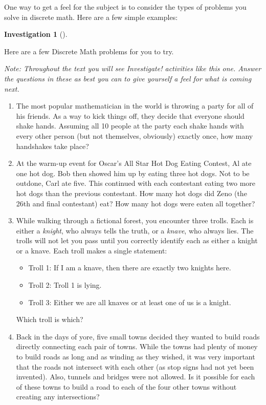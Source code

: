 \documentclass[10pt,]{book}
\theoremstyle{plain}
\theoremstyle{definition}
\theoremstyle{definition}
\newtheorem{investigation}[project]{Investigation}
\theoremstyle{definition}
\numberwithin{equation}{section}
\begin{document}
    One way to get a feel for the subject is to consider the types of problems you solve in discrete math. Here are a few simple examples:
\begin{investigation}[]\label{investigation-1}

      Here are a few Discrete Math problems for you to try.
\par

      \emph{Note: Throughout the text you will see \emph{Investigate!} activities like this one. Answer the questions in these as best you can to give yourself a feel for what is coming next.}
\leavevmode%
\begin{enumerate}
\item\hypertarget{li-1}{}
        The most popular mathematician in the world is throwing a party for all of his friends. As a way to kick things off, they decide that everyone should shake hands. Assuming all 10 people at the party each shake hands with every other person (but not themselves,
        obviously) exactly once, how many handshakes take place?
      \item\hypertarget{li-2}{}
        At the warm-up event for Oscar's All Star Hot Dog Eating Contest, Al ate one hot dog. Bob then showed him up by eating three hot dogs. Not to be outdone, Carl ate five. This continued with each contestant eating two more hot dogs than the previous contestant.
        How many hot dogs did Zeno (the 26th and final contestant) eat? How many hot dogs were eaten all together?
      \item\hypertarget{li-3}{}
        While walking through a fictional forest, you encounter three trolls. Each is either a \emph{knight}, who always tells the truth, or a \emph{knave}, who always lies. The trolls will not let you pass until you correctly identify each as either
        a knight or a knave. Each troll makes a single statement:


        \begin{itemize}[label=\textbullet]
\item{}Troll 1: If I am a knave, then there are exactly two knights here.\item{}Troll 2: Troll 1 is lying.\item{}Troll 3: Either we are all knaves or at least one of us is a knight.\end{itemize}



        Which troll is which?
      \item\hypertarget{li-7}{}
        Back in the days of yore, five small towns decided they wanted to build roads directly connecting each pair of towns. While the towns had plenty of money to build roads as long and as winding as they wished, it was very important that the roads not intersect
        with each other (as stop signs had not yet been invented). Also, tunnels and bridges were not allowed. Is it possible for each of these towns to build a road to each of the four other towns without creating any intersections?
      \end{enumerate}
\end{investigation}
\par
\end{document}
